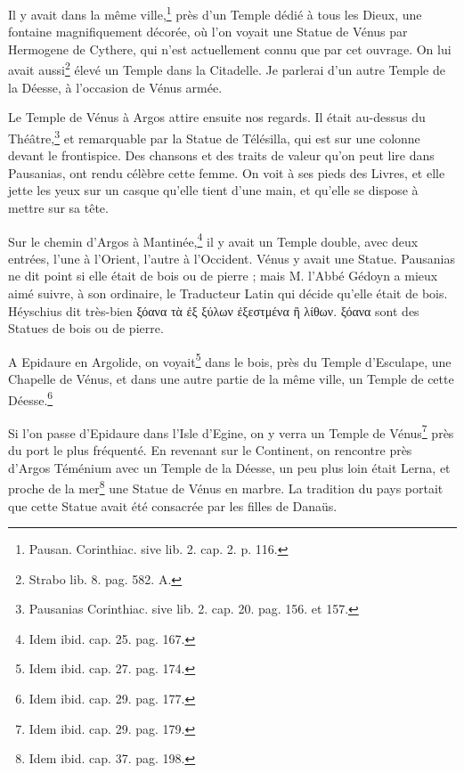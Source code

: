\documentclass[a4paper, 11pt, oneside, polutonikogreek, french]{article}
\begin{document}
Il y avait dans la même ville,\footnote{Pausan. Corinthiac. sive lib. 2. cap. 2. p. 116.} près d'un Temple dédié à tous les Dieux, une fontaine magnifiquement décorée, où l'on voyait une Statue de Vénus par Hermogene de Cythere, qui n'est actuellement connu que par cet ouvrage. On lui avait aussi\footnote{Strabo lib. 8. pag. 582. A.} élevé un Temple dans la Citadelle. Je parlerai d'un autre Temple de la Déesse, à l'occasion de Vénus armée.

Le Temple de Vénus à Argos attire ensuite nos regards. Il était au-dessus du Théâtre,\footnote{Pausanias Corinthiac. sive lib. 2. cap. 20. pag. 156. et 157.} et remarquable par la Statue de Télésilla, qui est sur une colonne devant le frontispice. Des chansons et des traits de valeur qu'on peut lire dans Pausanias, ont rendu célèbre cette femme. On voit à ses pieds des Livres, et elle jette les yeux sur un casque qu'elle tient d'une main, et qu'elle se dispose à mettre sur sa tête.

Sur le chemin d'Argos à Mantinée,\footnote{Idem ibid. cap. 25. pag. 167.} il y avait un Temple double, avec deux entrées, l'une à l'Orient, l'autre à l'Occident. Vénus y avait une Statue. Pausanias ne dit point si elle était de bois ou de pierre ; mais M. l'Abbé Gédoyn a mieux aimé suivre, à son ordinaire, le Traducteur Latin qui décide qu'elle était de bois. Héyschius dit très-bien ξόανα τὰ ἐξ ξύλων ἐξεστμένα ἢ λίθων. ξόανα sont des Statues de bois ou de pierre.

A Epidaure en Argolide, on voyait\footnote{Idem ibid. cap. 27. pag. 174.} dans le bois, près du Temple d'Esculape, une Chapelle de Vénus, et dans une autre partie de la même ville, un Temple de cette Déesse.\footnote{Idem ibid. cap. 29. pag. 177.}

Si l'on passe d'Epidaure dans l'Isle d'Egine, on y verra un Temple de Vénus\footnote{Idem ibid. cap. 29. pag. 179.} près du port le plus fréquenté. En revenant sur le Continent, on rencontre près d'Argos Téménium avec un Temple de la Déesse, un peu plus loin était Lerna, et proche de la mer\footnote{Idem ibid. cap. 37. pag. 198.} une Statue de Vénus en marbre. La tradition du pays portait que cette Statue avait été consacrée par les filles de Danaüs.
\end{document}

